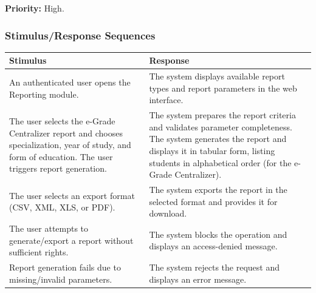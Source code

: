 \documentclass[11pt, a4paper]{article}
\begin{document}
\textbf{Priority:} High.

\subsubsection{Stimulus/Response Sequences}
\begin{table}[H]
\begin{tabularx}{\textwidth}{>{\raggedright\arraybackslash}p{6cm} >{\raggedright\arraybackslash}X}
\toprule
\textbf{Stimulus} & \textbf{Response} \\
\midrule
An authenticated user opens the Reporting module. & The system displays available report types and report parameters in the web interface. \\
\midrule
The user selects the e-Grade Centralizer report and chooses specialization, year of study, and form of education. The user triggers report generation. & The system prepares the report criteria and validates parameter completeness. The system generates the report and displays it in tabular form, listing students in alphabetical order (for the e-Grade Centralizer). \\
\midrule
The user selects an export format (CSV, XML, XLS, or PDF). & The system exports the report in the selected format and provides it for download. \\
\midrule
The user attempts to generate/export a report without sufficient rights. & The system blocks the operation and displays an access-denied message. \\
\midrule
Report generation fails due to missing/invalid parameters. & The system rejects the request and displays an error message. \\
\bottomrule
\end{tabularx}
\end{table}
\end{document}
